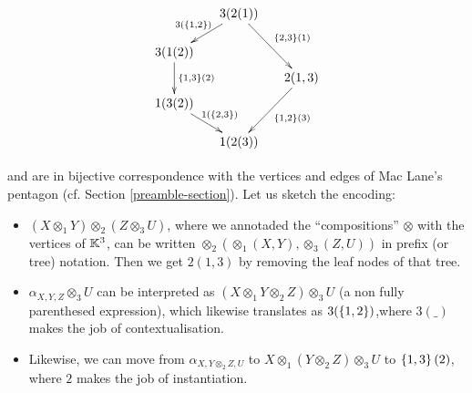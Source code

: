 \begin{center}
$$\xymatrix @-1.65pc {&& 3(2(1)) \ar @{->}[ddll]_{3(\set{1,2})} \ar @{->}[dddrr]^{\set{2,3}(1)}&& \\
 &&&&\\
3(1(2))   \ar @{->}[dd]^{\set{1,3}(2)}&&   && \\
 &&&&2(1,3) \ar @{->}[dddll]^{\set{1,2}(3)}\\
 1(3(2)) \ar @{->}[ddrr]^{1(\set{2,3})} &  &\\
 &&&&\\
 &&1(2(3))&&}$$
\end{center}
and are in bijective correspondence with the vertices and edges of Mac Lane's pentagon (cf. Section \ref{preamble-section}). 
  Let us sketch the encoding:
  \begin{itemize}
  \item $(X\otimes_1 Y)\otimes_2 (Z\otimes_3 U)$, where we annotaded the ``compositions'' $\otimes$ with the vertices of ${\mathbb K}^3$, can be written $\otimes_2(\otimes_1(X,Y),\otimes_3(Z,U))$ in prefix (or tree) notation. Then we get 
 $2(1,3)$ by removing the leaf nodes of that tree.
 \item $\alpha_{X,Y,Z}\otimes_3 U$ can be interpreted as $(X\otimes_1 Y\otimes_2 Z)\otimes_3 U$ (a non fully parenthesed expression), which likewise 
 translates as $3(\left\{1,2\right\})$,where $3(\_)$ makes the job of contextualisation.
 \item Likewise, we can move from
$\alpha_{X,Y\otimes_2 Z,U}$ to $X\otimes_1(Y\otimes_2 Z)\otimes_3 U$ to $\left\{1,3\right\}(2)$, where $2$ makes the job of instantiation.
\end{itemize}

